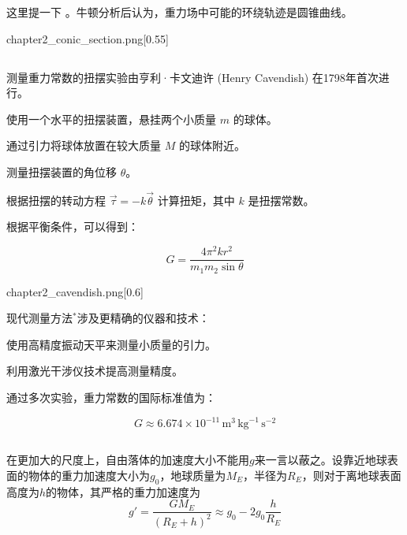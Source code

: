 这里提一下 。牛顿分析后认为，重力场中可能的环绕轨迹是圆锥曲线。
\begin{singlefigure}[圆锥曲线]{chapter2_conic_section.png}[0.55]
\end{singlefigure}
\subsection[测量引力常数]{}
测量重力常数的扭摆实验由亨利·卡文迪许 (Henry Cavendish) 在1798年首次进行。

\begin{Itemize}
    \item 使用一个水平的扭摆装置，悬挂两个小质量 \( m \) 的球体。
    \item 通过引力将球体放置在较大质量 \( M \) 的球体附近。
    \item 测量扭摆装置的角位移 \( \theta \)。
    \item 根据扭摆的转动方程 \( \vec{\tau} = -k \vec{\theta} \) 计算扭矩，其中 \( k \) 是扭摆常数。
\end{Itemize}

根据平衡条件，可以得到：

\[
G = \frac{4 \pi^2 k r^2}{m_1 m_2 \sin\theta}
\]
\begin{singlefigure}[扭摆实验]{chapter2_cavendish.png}[0.6]
\end{singlefigure}
现代测量方法$^*$涉及更精确的仪器和技术：

\begin{Itemize}
    \item 使用高精度振动天平来测量小质量的引力。
    \item 利用激光干涉仪技术提高测量精度。
\end{Itemize}

通过多次实验，重力常数的国际标准值为：

\[
G \approx 6.674 \times 10^{-11} \, \text{m}^3 \, \text{kg}^{-1} \, \text{s}^{-2}
\]

\subsection[自由落体加速度]{}
在更加大的尺度上，自由落体的加速度大小不能用$g$来一言以蔽之。设靠近地球表面的物体的重力加速度大小为$g_0$，地球质量为$M_E$，半径为$R_E$，则对于离地球表面高度为$h$的物体，其严格的重力加速度为
\[g'=\frac{GM_{E}}{(R_{E}+h)^{2}}\approx g_{0}-2g_{0}\frac{h}{R_{E}}\]
